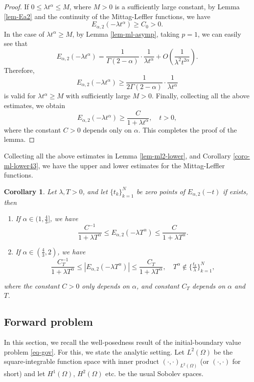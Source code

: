 \documentclass[11pt]{article}
\newtheorem{corollary}{Corollary}[section]
\numberwithin{equation}{section}
\begin{document}
\begin{proof}
If $0 \leq \lambda t^\alpha \leq M$, where $ M >0 $ is a sufficiently large constant, by Lemma \ref{lem-Ea2} and the continuity of the Mittag-Leffler functions, we have
\[
E_{\alpha, 2}(-\lambda t^{\alpha}) \geq C_0 > 0.
\]
In the case of $ \lambda t^{\alpha} \geq M $, by Lemma \ref{lem-ml-asymp}, taking $ p = 1 $, we can easily see that
\[
E_{\alpha, 2}(-\lambda t^{\alpha}) = \frac{1}{\Gamma(2 - \alpha)}\cdot\frac{1}{\lambda t^{\alpha}} + O(\frac1{\lambda^2 t^{2\alpha}}).
\]
Therefore,
\[
E_{\alpha, 2}(-\lambda t^{\alpha}) \geq \frac{1}{2 \Gamma(2 - \alpha)}\cdot \frac{1}{\lambda t^{\alpha}}
\]
is valid for $\lambda t^{\alpha} \geq M$ with sufficiently large $M>0$. Finally, collecting all the above estimates, we obtain
\[
E_{\alpha, 2}(-\lambda t^{\alpha}) \geq \frac{C}{1 + \lambda t^{\alpha}}, \quad t>0,
\]
where the constant $C>0$ depends only on $\alpha$. This completes the proof of the lemma.
\end{proof}

Collecting all the above estimates in Lemma \ref{lem-ml2-lower}, and Corollary \ref{coro-ml-lower43}, we have the upper and lower estimates for the Mittag-Leffler functions.
\begin{corollary}\label{coro-<ml<}
Let $\lambda,T>0$, and let $\{t_k\}_{k=1}^N$ be zero points of $E_{\alpha,2}(-t)$ if exists, then
\begin{enumerate}
    \item If $\alpha \in (1,\frac43]$, we have
\[
\frac{C^{-1}}{1 + \lambda T^\alpha} \le E_{\alpha, 2}(-\lambda T^{\alpha}) \leq \frac{C}{1 + \lambda T^\alpha}.
\]
\item If $\alpha\in (\frac43,2)$, we have
\[
\frac{C_T^{-1}}{1 + \lambda T^\alpha} \le |E_{\alpha, 2}(-\lambda T^{\alpha})| \leq \frac{C_T}{1 + \lambda T^\alpha},\quad T^\alpha\not\in \big\{\tfrac{t_k}{\lambda}\big\}_{k=1}^N,
\]
\end{enumerate}
where the constant $C>0$ only depends on $\alpha$, and constant  $C_T$ depends on $\alpha$ and $T$.
\end{corollary}


\subsection{Forward problem}
In this section, we recall the well-posedness result of the initial-boundary value problem \eqref{eq-gov}. For this, we state the analytic setting. Let $L^2(\Omega)$ be the square-integrable function space with inner product $(\cdot,\cdot)_{L^2(\Omega)}$ (or $(\cdot,\cdot)$ for short) and let $H^1(\Omega)$, $H^2(\Omega)$ etc. be the usual Sobolev spaces.
\end{document}
